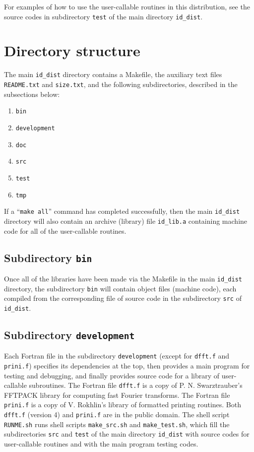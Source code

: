 ﻿\documentclass[letterpaper,12pt]{article}
\begin{document}
For examples of how to use the user-callable routines
in this distribution, see the source codes in subdirectory {\tt test}
of the main directory {\tt id\_dist}.



\section{Directory structure}

The main {\tt id\_dist} directory contains a Makefile,
the auxiliary text files {\tt README.txt} and {\tt size.txt},
and the following subdirectories, described in the subsections below:
%
\begin{enumerate}
\item {\tt bin}
\item {\tt development}
\item {\tt doc}
\item {\tt src}
\item {\tt test}
\item {\tt tmp}
\end{enumerate}
%
If a ``{\tt make all}'' command has completed successfully,
then the main {\tt id\_dist} directory will also contain
an archive (library) file {\tt id\_lib.a} containing machine code
for all of the user-callable routines.


\subsection{Subdirectory {\tt bin}}

Once all of the libraries have been made via the Makefile
in the main {\tt id\_dist} directory,
the subdirectory {\tt bin} will contain object files (machine code),
each compiled from the corresponding file of source code
in the subdirectory {\tt src} of {\tt id\_dist}.


\subsection{Subdirectory {\tt development}}

Each Fortran file in the subdirectory {\tt development}
(except for {\tt dfft.f} and {\tt prini.f})
specifies its dependencies at the top, then provides a main program
for testing and debugging, and finally provides source code
for a library of user-callable subroutines.
The Fortran file {\tt dfft.f} is a copy of P. N. Swarztrauber's FFTPACK library
for computing fast Fourier transforms.
The Fortran file {\tt prini.f} is a copy of V. Rokhlin's library
of formatted printing routines.
Both {\tt dfft.f} (version 4) and {\tt prini.f} are in the public domain.
The shell script {\tt RUNME.sh} runs shell scripts {\tt make\_src.sh}
and {\tt make\_test.sh}, which fill the subdirectories {\tt src}
and {\tt test} of the main directory {\tt id\_dist}
with source codes for user-callable routines
and with the main program testing codes.
\end{document}
